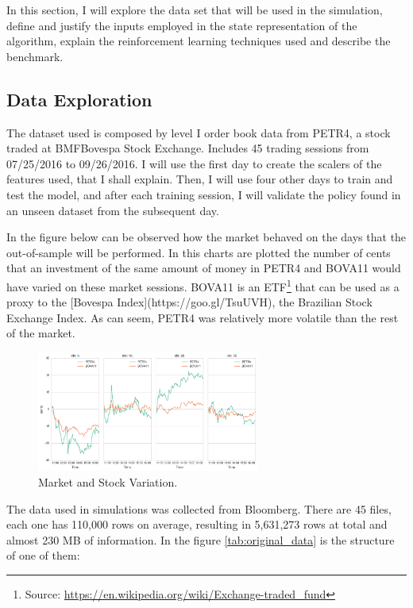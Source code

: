 \documentclass[a4paper]{article}
\begin{document}
In this section, I will explore the data set that will be used in the simulation, define and justify the inputs employed in the state representation of the algorithm, explain the reinforcement learning techniques used and describe the benchmark.

\subsection{Data Exploration}
The dataset used is composed by level I order book data from PETR4, a stock traded at BMFBovespa Stock Exchange. Includes 45 trading sessions from 07/25/2016 to 09/26/2016. I will use the first day to create the scalers of the features used, that I shall explain. Then, I will use four other days to train and test the model, and after each training session, I will validate the policy found in an unseen dataset from the subsequent day.

In the figure below can be observed how the market behaved on the days that the out-of-sample will be performed. In this charts are plotted the number of cents that an investment of the same amount of money in PETR4 and BOVA11 would have varied on these market sessions. BOVA11 is an ETF\footnote{Source: \url{https://en.wikipedia.org/wiki/Exchange-traded_fund}} that can be used as a proxy to the [Bovespa Index](https://goo.gl/TsuUVH), the Brazilian Stock Exchange Index. As can seem, PETR4 was relatively more volatile than the rest of the market.

\begin{figure}[ht]
\centering
\includegraphics[width=0.65\textwidth]{figures/market.png}
\caption{\label{fig:market}Market and Stock Variation.}
\end{figure}

The data used in simulations was collected from Bloomberg. There are 45 files, each one has 110,000 rows on average, resulting in 5,631,273 rows at total and almost  230 MB of information. In the figure \ref{tab:original_data} is the structure of one of them:
\end{document}
